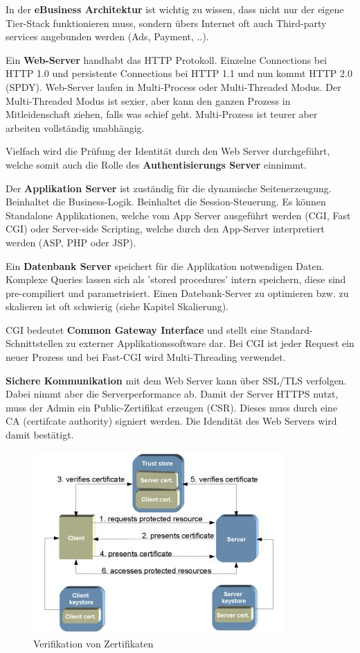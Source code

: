 In der \textbf{eBusiness Architektur} ist wichtig zu wissen, dass nicht nur der eigene Tier-Stack funktionieren muss, sondern übers Internet oft auch Third-party services angebunden werden (Ads, Payment, ..).

Ein \textbf{Web-Server} handhabt das HTTP Protokoll. Einzelne Connections bei HTTP 1.0 und persistente Connections bei HTTP 1.1 und nun kommt HTTP 2.0 (SPDY). Web-Server laufen in Multi-Process oder Multi-Threaded Modus. Der Multi-Threaded Modus ist sexier, aber kann den ganzen Prozess in Mitleidenschaft ziehen, falls was schief geht. Multi-Prozess ist teurer aber arbeiten vollständig unabhängig.

Vielfach wird die Prüfung der Identität durch den Web Server durchgeführt, welche somit auch die Rolle des \textbf{Authentisierungs Server} einnimmt.

Der \textbf{Applikation Server} ist zuständig für die dynamische Seitenerzeugung. Beinhaltet die Business-Logik. Beinhaltet die Session-Steuerung. Es können Standalone Applikationen, welche vom App Server ausgeführt werden (CGI, Fast CGI) oder Server-side Scripting, welche durch den App-Server interpretiert werden (ASP, PHP oder JSP).

Ein \textbf{Datenbank Server} speichert für die Applikation notwendigen Daten. Komplexe Queries lassen sich als 'stored procedures' intern speichern, diese sind pre-compiliert und parametrisiert. Einen Datebank-Server zu optimieren bzw. zu skalieren ist oft schwierig (siehe Kapitel Skalierung).

CGI bedeutet \textbf{Common Gateway Interface} und stellt eine Standard-Schnittstellen zu externer Applikationssoftware dar. Bei CGI ist jeder Request ein neuer Prozess und bei Fast-CGI wird Multi-Threading verwendet.

\textbf{Sichere Kommunikation} mit dem Web Server kann über SSL/TLS verfolgen. Dabei nimmt aber die Serverperformance ab. Damit der Server HTTPS nutzt, muss der Admin ein Public-Zertifikat erzeugen (CSR). Dieses muss durch eine CA (certifcate authority) signiert werden. Die Idendität des Web Servers wird damit bestätigt. 

\begin{figure}[h!]
	\centering
	\includegraphics[width=0.7\linewidth]{fig/cms-ablauf-verifikation-von-zertifikaten}
	\caption{Verifikation von Zertifikaten}
	\label{fig:cms-ablauf-verifikation-von-zertifikaten}
\end{figure}

